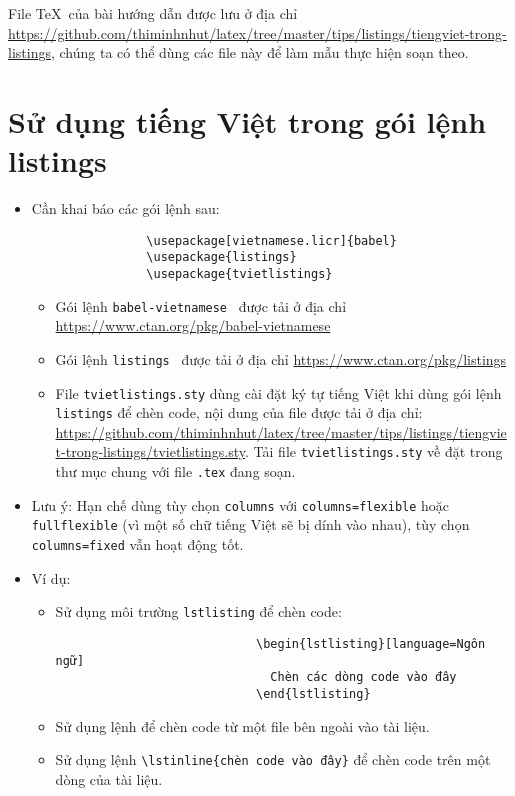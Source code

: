 \documentclass[12pt,a4paper]{article}
\begin{document}
	File \TeX\ của bài hướng dẫn được lưu ở địa chỉ \url{https://github.com/thiminhnhut/latex/tree/master/tips/listings/tiengviet-trong-listings}, chúng ta có thể dùng các file này để làm mẫu thực hiện soạn theo.

\section{Sử dụng tiếng Việt trong gói lệnh listings}
	\begin{itemize}
		\item Cần khai báo các gói lệnh sau:
			\begin{verbatim}
				\usepackage[vietnamese.licr]{babel}
				\usepackage{listings}
				\usepackage{tvietlistings}				
			\end{verbatim}
				\begin{itemize}					
					\item Gói lệnh \verb|babel-vietnamese|~\cite{vietnamese-ctan} được tải ở địa chỉ \url{https://www.ctan.org/pkg/babel-vietnamese}
					
					\item Gói lệnh \verb|listings|~\cite{listings-ctan} được tải ở địa chỉ \url{https://www.ctan.org/pkg/listings}
					
					\item File \verb|tvietlistings.sty| dùng cài đặt ký tự tiếng Việt khi dùng gói lệnh \verb|listings| để chèn code, nội dung của file được tải ở địa chỉ: \url{https://github.com/thiminhnhut/latex/tree/master/tips/listings/tiengviet-trong-listings/tvietlistings.sty}. Tải file \verb|tvietlistings.sty| về đặt trong thư mục chung với file \verb|.tex| đang soạn.
				\end{itemize}
			
			\item Lưu ý: Hạn chế dùng tùy chọn \verb|columns| với \verb|columns=flexible| hoặc \verb|fullflexible| (vì một số chữ tiếng Việt sẽ bị dính vào nhau), tùy chọn \verb|columns=fixed| vẫn hoạt động tốt.
			\item Ví dụ:
				\begin{itemize}
					\item Sử dụng môi trường \verb|lstlisting| để chèn code:
						\begin{verbatim}
							\begin{lstlisting}[language=Ngôn ngữ]
							  Chèn các dòng code vào đây
							\end{lstlisting}
						\end{verbatim}
					\item Sử dụng lệnh \verb|| để chèn code từ một file bên ngoài vào tài liệu.
					
					\item Sử dụng lệnh \verb|\lstinline{chèn code vào đây}| để chèn code trên một dòng của tài liệu.
				\end{itemize}
	\end{itemize}
\end{document}
